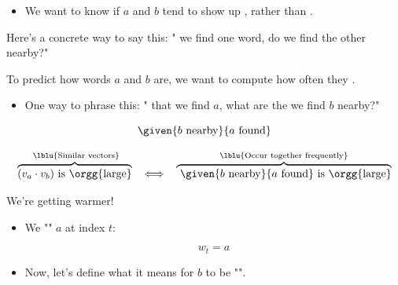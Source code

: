         \begin{itemize}
            \item We want to know if $a$ and $b$ tend to show up , rather than .
        \end{itemize}

        Here's a concrete way to say this: " we find one word,  do we find the other nearby?"\\

        \begin{concept}
            To predict how  words $a$ and $b$ are, we want to compute how often they .

            \begin{itemize}
                \item One way to phrase this: " that we find $a$, what are the  we find $b$ nearby?"
            \end{itemize}

            \begin{equation*}
                \given{b \text{ nearby} }{a \text{ found}}
            \end{equation*}
        
        \end{concept}

        \begin{equation*}
            \overbrace{ 
                (v_a \cdot v_b) \text{ is \orgg{large}}
            }^{\text{ \lblu{Similar vectors}}}
            \;\;\iff\;\; 
            \overbrace{
                \text{ $\given{b \text{ nearby} }{a \text{ found}}$  is \orgg{large}}}
            ^{\text{\lblu{Occur together frequently}}}
        \end{equation*}

        We're getting warmer! 
        
        \begin{itemize}
            \item We "" $a$ at index $t$: 

                \begin{equation}
                    w_t=a
                \end{equation}

            \item Now, let's define what it means for $b$ to be "".\\
        \end{itemize}


